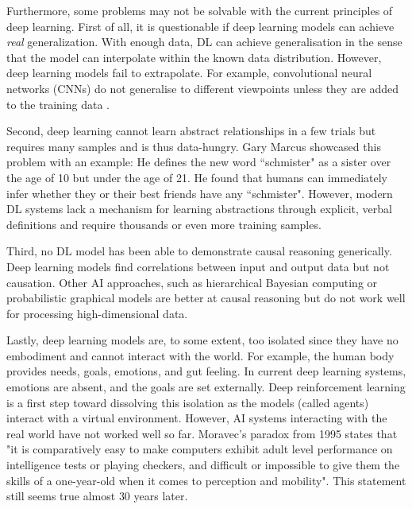 Furthermore, some problems may not be solvable with the current principles of deep learning.
First of all, it is questionable if deep learning models can achieve \emph{real} generalization.
With enough data, DL can achieve generalisation in the sense that the model can interpolate within the known data distribution.
However, deep learning models fail to extrapolate.
For example, convolutional neural networks (CNNs) do not generalise to different viewpoints unless they are added to the training data .

Second, deep learning cannot learn abstract relationships in a few trials but requires many samples and is thus data-hungry.
Gary Marcus  showcased this problem with an example: He defines the new word ``schmister" as a sister over the age of 10 but under the age of 21. He found that humans can immediately infer whether they or their best friends have any ``schmister". However, modern DL systems lack a mechanism for learning abstractions through explicit, verbal definitions and require thousands or even more training samples.

Third, no DL model has been able to demonstrate causal reasoning generically.
Deep learning models find correlations between input and output data but not causation.
Other AI approaches, such as hierarchical Bayesian computing or probabilistic graphical models are better at causal reasoning but do not work well for processing high-dimensional data.

Lastly, deep learning models are, to some extent, too isolated since they have no embodiment and cannot interact with the world.
For example, the human body provides needs, goals, emotions, and gut feeling.
In current deep learning systems, emotions are absent, and the goals are set externally.
Deep reinforcement learning is a first step toward dissolving this isolation as the models (called agents) interact with a virtual environment. 
However, AI systems interacting with the real world have not worked well so far.
Moravec's paradox from 1995  states that "it is comparatively easy to make computers exhibit adult level performance on intelligence tests or playing checkers, and difficult or impossible to give them the skills of a one-year-old when it comes to perception and mobility".
This statement still seems true almost $30$ years later.



